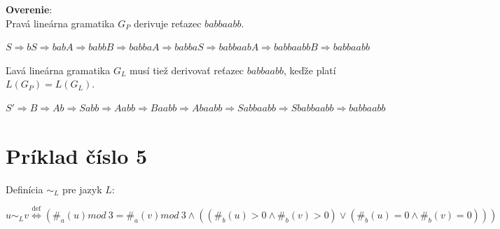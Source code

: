 \documentclass[11pt,a4paper]{article}
\begin{document}
\textbf{Overenie}:\\
Pravá lineárna gramatika $G_P$ derivuje reťazec $babbaabb$.
\begin{center}
$S \Rightarrow bS \Rightarrow babA  \Rightarrow babbB \Rightarrow babbaA \Rightarrow babbaS \Rightarrow babbaabA \Rightarrow babbaabbB \Rightarrow babbaabb$
\end{center}

Ľavá lineárna gramatika $G_L$ musí tiež derivovať reťazec $babbaabb$, keďže platí $L(G_P)=L(G_L)$.
\begin{center}
$S' \Rightarrow B \Rightarrow Ab \Rightarrow Sabb \Rightarrow Aabb \Rightarrow Baabb \Rightarrow Abaabb \Rightarrow Sabbaabb \Rightarrow Sbabbaabb \Rightarrow babbaabb$
\end{center}




\section{Príklad číslo 5}

Definícia $\sim_L$ pre jazyk $L$:\\[-1.5em]
\begin{center}
$u \sim_L v \stackrel{\text{def}}{\Longleftrightarrow} (\#_a(u)mod\ 3 = \#_a(v)mod\ 3 \wedge ((\#_b(u) > 0 \wedge \#_b(v) > 0) \vee (\#_b(u) = 0 \wedge \#_b(v) = 0)))$
\end{center}
\end{document}
